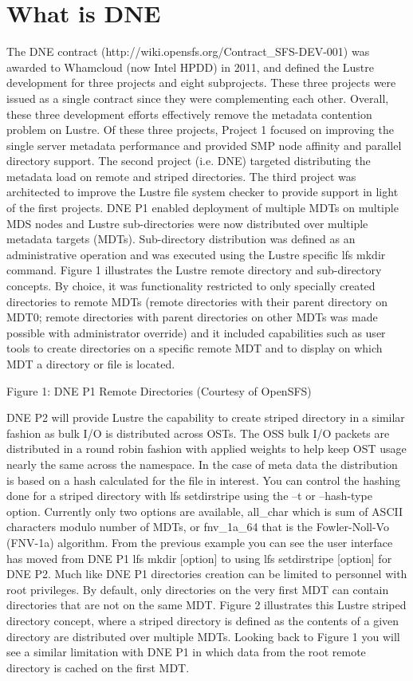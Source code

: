 \documentclass[conference,compsoc]{IEEEtran}
\begin{document}
\section{What is DNE}

The DNE contract (http://wiki.opensfs.org/Contract_SFS-DEV-001) was awarded to
Whamcloud (now Intel HPDD) in 2011, and defined the Lustre development for
three projects and eight subprojects. These three projects were issued as a
single contract since they were complementing each other. Overall, these three
development efforts effectively remove the metadata contention problem on
Lustre. Of these three projects, Project 1 focused on improving the single
server metadata performance and provided SMP node affinity and parallel
directory support. The second project (i.e. DNE) targeted distributing the
metadata load on remote and striped directories. The third project was
architected to improve the Lustre file system checker to provide support in
light of the first projects.  DNE P1 enabled deployment of multiple MDTs on
multiple MDS nodes and Lustre sub-directories were now distributed over
multiple metadata targets (MDTs). Sub-directory distribution was defined as an
administrative operation and was executed using the Lustre specific lfs mkdir
command. Figure 1 illustrates the Lustre remote directory and sub-directory
concepts. By choice, it was functionality restricted to only specially created
directories to remote MDTs (remote directories with their parent directory on
MDT0; remote directories with parent directories on other MDTs was made
possible with administrator override) and it included capabilities such as user
tools to create directories on a specific remote MDT and to display on which
MDT a directory or file is located. 
 
Figure 1: DNE P1 Remote Directories (Courtesy of OpenSFS)

DNE P2 will provide Lustre the capability to create striped directory in a
similar fashion as bulk I/O is distributed across OSTs. The OSS bulk I/O
packets are distributed in a round robin fashion with applied weights to help
keep OST usage nearly the same across the namespace. In the case of meta data
the distribution is based on a hash calculated for the file in interest. You
can control the hashing done for a striped directory with lfs setdirstripe
using the –t or --hash-type option. Currently only two options are available,
all_char which is sum of ASCII characters modulo number of MDTs, or fnv_1a_64
that is the Fowler-Noll-Vo (FNV-1a) algorithm. From the previous example you
can see the user interface has moved from DNE P1 lfs mkdir [option] to using
lfs setdirstripe [option] for DNE P2. Much like DNE P1 directories creation can
be limited to personnel with root privileges. By default, only directories on
the very first MDT can contain directories that are not on the same MDT. Figure
2 illustrates this Lustre striped directory concept, where a striped directory
is defined as the contents of a given directory are distributed over multiple
MDTs.  Looking back to Figure 1 you will see a similar limitation with DNE P1
in which data from the root remote directory is cached on the first MDT.  
 
\end{document}
